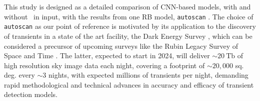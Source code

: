 
This study is designed as a detailed comparison of CNN-based models, with and without \diff\ in input, with the results from one RB model, \texttt{autoscan} \citep{Goldstein_2015}. The choice of \texttt{autoscan} as our point of reference is motivated by its application to the discovery of transients in a state of the art facility, the Dark Energy Survey \citep{DES}, which can be considered a precursor of upcoming surveys like the Rubin Legacy Survey of Space and Time \citep{ivezic2019lsst}. The latter,  expected to start in 2024, will deliver $\sim 20~\mathrm{Tb}$ of high resolution sky image data each night, covering a footprint of $\sim20,000$ sq. deg. every $\sim 3$ nights, with expected millions of transients per night, demanding rapid methodological and technical advances in accuracy and efficacy of transient detection models.






